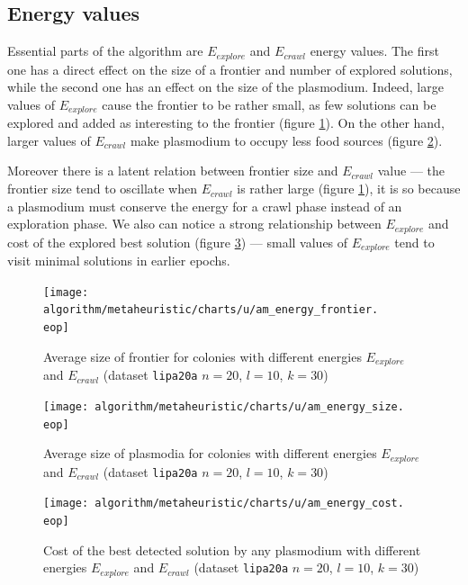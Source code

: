 \documentclass[english,a4paper,twoside]{ppfcmthesis}
\begin{document}
\subsection{Energy values}

Essential parts of the algorithm are $E_{explore}$ and $E_{crawl}$ energy values. The first one has a direct effect on the size of a frontier and number of explored solutions, while the second one has an effect on the size of the plasmodium. Indeed, large values of $E_{explore}$ cause the frontier to be rather small, as few solutions can be explored and added as interesting to the frontier (figure \ref{figure:am_energy_frontier}). On the other hand, larger values of $E_{crawl}$ make plasmodium to occupy less food sources (figure \ref{figure:am_energy_size}).

Moreover there is a latent relation between frontier size and $E_{crawl}$ value --- the frontier size tend to oscillate when $E_{crawl}$ is rather large (figure \ref{figure:am_energy_frontier}), it is so because a plasmodium must conserve the energy for a crawl phase instead of an exploration phase. We also can notice a strong relationship between $E_{explore}$ and cost of the explored best solution (figure \ref{figure:am_energy_cost}) --- small values of $E_{explore}$ tend to visit minimal solutions in earlier epochs.

\begin{figure}
  \centering

  \texttt{[image: algorithm/metaheuristic/charts/u/am\_energy\_frontier.\\eop]}

  \caption{Average size of frontier for colonies with different energies $E_{explore}$ and $E_{crawl}$ (dataset \texttt{lipa20a} $n=20$, $l=10$, $k=30$)}
  \label{figure:am_energy_frontier}
\end{figure}

\begin{figure}
  \centering

  \texttt{[image: algorithm/metaheuristic/charts/u/am\_energy\_size.\\eop]}

  \caption{Average size of plasmodia for colonies with different energies $E_{explore}$ and $E_{crawl}$ (dataset \texttt{lipa20a} $n=20$, $l=10$, $k=30$)}
  \label{figure:am_energy_size}
\end{figure}

\begin{figure}
  \centering

  \texttt{[image: algorithm/metaheuristic/charts/u/am\_energy\_cost.\\eop]}

  \caption{Cost of the best detected solution by any plasmodium with different energies $E_{explore}$ and $E_{crawl}$ (dataset \texttt{lipa20a} $n=20$, $l=10$, $k=30$)}
  \label{figure:am_energy_cost}
\end{figure}
\end{document}
